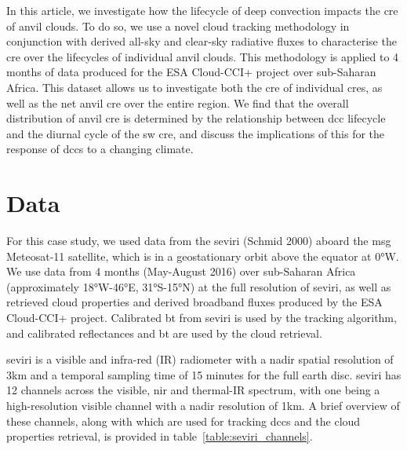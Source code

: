In this article, we investigate how the lifecycle of deep convection
impacts the \acrshort{cre} of anvil clouds. To do so, we use a
novel cloud tracking methodology in conjunction with derived all-sky and
clear-sky radiative fluxes to characterise the \acrshort{cre} over the lifecycles
of individual anvil clouds. This methodology is applied to 4 months of
data produced for the ESA Cloud-CCI+ project over sub-Saharan Africa.
This dataset allows us to investigate both the \acrshort{cre} of individual \acrshort{cre}s,
as well as the net anvil \acrshort{cre} over the entire region. We find that the
overall distribution of anvil \acrshort{cre} is determined by the relationship
between \acrshort{dcc} lifecycle and the diurnal cycle of the \acrshort{sw} \acrshort{cre}, and discuss
the implications of this for the response of \acrshort{dcc}s to a changing climate.

\section{Data}

For this case study, we used data from the \acrshort{seviri} (Schmid 2000) aboard the \acrshort{msg} Meteosat-11 satellite, which is in a geostationary orbit above the equator at 0°W. 
We use data from 4 months (May-August 2016) over sub-Saharan Africa (approximately 18°W-46°E, 31°S-15°N) at the full resolution of \acrshort{seviri}, as well as retrieved cloud properties and derived broadband fluxes produced by the ESA Cloud-CCI+ project.
Calibrated \acrshort{bt} from \acrshort{seviri} is used by the tracking algorithm, and calibrated reflectances and \acrshort{bt} are used by the cloud retrieval.

\acrshort{seviri} is a visible and infra-red (IR) radiometer with a nadir spatial resolution of 3km and a temporal sampling time of 15 minutes for the full earth disc. 
\acrshort{seviri} has 12 channels across the visible, \acrshort{nir} and thermal-IR spectrum, with one being a high-resolution visible channel with a nadir resolution of 1km. 
A brief overview of these channels, along with which are used for tracking \acrshort{dcc}s and the cloud properties retrieval, is provided in table~\ref{table:seviri_channels}.


